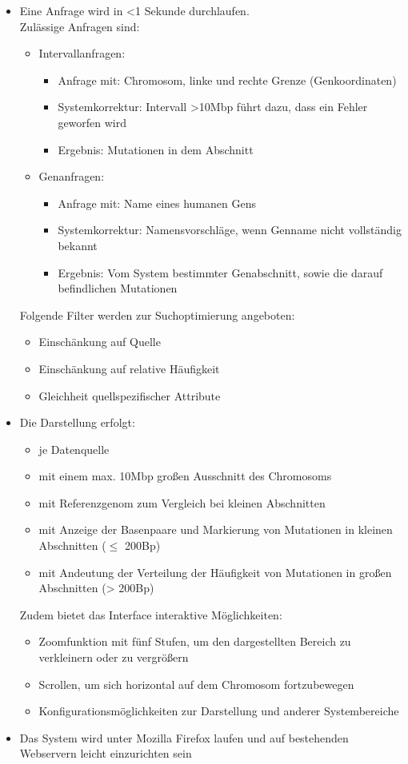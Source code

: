 \begin{itemize}
\item Eine Anfrage wird in <1 Sekunde durchlaufen.\\
Zulässige Anfragen sind:
\begin{itemize}
\item Intervallanfragen:
\begin{itemize}
\item Anfrage mit: Chromosom, linke und rechte Grenze (Genkoordinaten)
\item Systemkorrektur: Intervall >10Mbp führt dazu, dass ein Fehler geworfen wird
\item Ergebnis: Mutationen in dem Abschnitt
\end{itemize}
\item Genanfragen:
\begin{itemize}
\item Anfrage mit: Name eines humanen Gens
\item Systemkorrektur: Namensvorschläge, wenn Genname nicht vollständig bekannt
\item Ergebnis: Vom System bestimmter Genabschnitt, sowie die darauf befindlichen Mutationen
\end{itemize} 
\end{itemize}
\newpage
Folgende Filter werden zur Suchoptimierung angeboten:
\begin{itemize}
\item Einschänkung auf Quelle
\item Einschänkung auf relative Häufigkeit
\item Gleichheit quellspezifischer Attribute
\end{itemize}

\item Die Darstellung erfolgt:
\begin{itemize}
\item je Datenquelle
\item mit einem max. 10Mbp großen Ausschnitt des Chromosoms
\item mit Referenzgenom zum Vergleich bei kleinen Abschnitten
\item mit Anzeige der Basenpaare und Markierung von Mutationen in kleinen Abschnitten ($\leq$ 200Bp)
\item mit Andeutung der Verteilung der Häufigkeit von Mutationen in großen Abschnitten (> 200Bp)
\end{itemize}
Zudem bietet das Interface interaktive Möglichkeiten:
\begin{itemize}
\item Zoomfunktion mit fünf Stufen, um den dargestellten Bereich zu verkleinern oder zu vergrößern
\item Scrollen, um sich horizontal auf dem Chromosom fortzubewegen
\item Konfigurationsmöglichkeiten zur Darstellung und anderer Systembereiche
\end{itemize}

\item Das System wird unter Mozilla Firefox laufen und auf bestehenden Webservern leicht einzurichten sein
\end{itemize}

